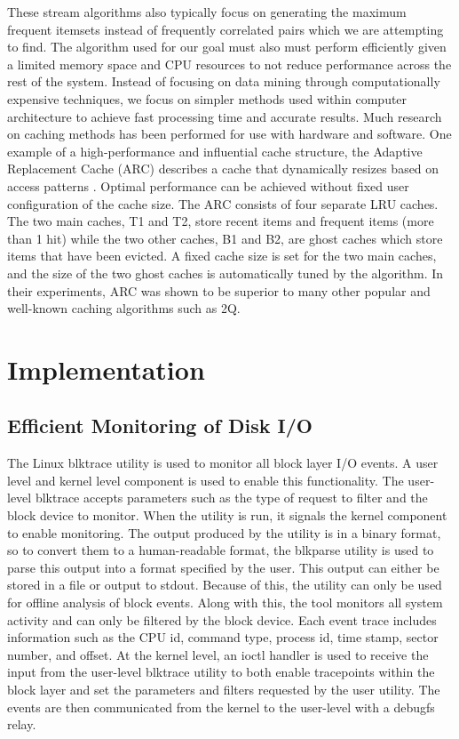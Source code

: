 \documentclass[MEng]{uofl}
\begin{document}
These stream algorithms also typically focus on generating the maximum frequent itemsets instead of frequently correlated pairs which we are attempting to find. The algorithm used for our goal must also must perform efficiently given a limited memory space and CPU resources to not reduce performance across the rest of the system. Instead of focusing on data mining through computationally expensive techniques, we focus on simpler methods used within computer architecture to achieve fast processing time and accurate results. Much research on caching methods has been performed for use with hardware and software. One example of a high-performance and influential cache structure, the Adaptive Replacement Cache (ARC) describes a cache that dynamically resizes based on access patterns \cite{Megiddo}. Optimal performance can be achieved without fixed user configuration of the cache size. The ARC consists of four separate LRU caches. The two main caches, T1 and T2, store recent items and frequent items (more than 1 hit) while the two other caches, B1 and B2, are ghost caches which store items that have been evicted. A fixed cache size is set for the two main caches, and the size of the two ghost caches is automatically tuned by the algorithm. In their experiments, ARC was shown to be superior to many other popular and well-known caching algorithms such as 2Q\cite{Megiddo}.



\chapter{Implementation}

\section{Efficient Monitoring of Disk I/O}
The Linux blktrace utility is used to monitor all block layer I/O events. A user level and kernel level component is used to enable this functionality. The user-level blktrace accepts parameters such as the type of request to filter and the block device to monitor. When the utility is run, it signals the kernel component to enable monitoring. The output produced by the utility is in a binary format, so to convert them to a human-readable format, the blkparse utility is used to parse this output into a format specified by the user. This output can either be stored in a file or output to stdout. Because of this, the utility can only be used for offline analysis of block events. Along with this, the tool monitors all system activity and can only be filtered by the block device. Each event trace includes information such as the CPU id, command type, process id, time stamp, sector number, and offset. At the kernel level, an ioctl handler is used to receive the input from the user-level blktrace utility to both enable tracepoints within the block layer and set the parameters and filters requested by the user utility. The events are then communicated from the kernel to the user-level with a debugfs relay. 
\end{document}
